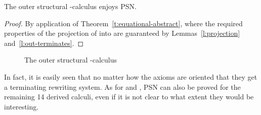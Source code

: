 \documentclass{LMCS}
\renewcommand{\>}{\rightarrow}
\begin{document}
\begin{cor}
The outer structural -calculus  enjoys PSN.
\end{cor}

\begin{proof}
By application of Theorem~\ref{t:equational-abstract},
where the required properties 
of the projection of  into 
are guaranteed by Lemmas~\ref{l:projection}
and~\ref{l:out-terminates}.
\end{proof}


\begin{figure}

\caption{\label{fig:out-oriented-f} The outer structural -calculus }
\end{figure}

In fact, it is easily seen that no matter how the axioms  are oriented that they get a terminating
rewriting system. As for  and ,  
PSN can also be proved for the remaining 14
derived calculi, even if it is not clear to what extent
they  would be interesting.
\end{document}

